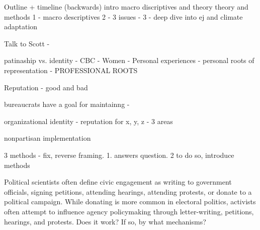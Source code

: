 Outline + timeline (backwards) 
intro
macro discriptives and theory 
theory and methods
1 - macro descriptives 
2 - 3 issues - 
3 - deep dive into ej and climate adaptation 

Talk to Scott 
- 

patinaship vs. identity 
- CBC
- Women 
- Personal experiences 
- personal roots of representation 
- PROFESSIONAL ROOTS 

Reputation - good and bad

bureaucrats have a goal for maintainng 
- 

organizational identity - reputation for x, y, z 
- 3 areas 

nonpartisan implementation


3 methods 
- fix, reverse framing. 1. answers question. 2 to do so, introduce methods 
















 


  
Political scientists often define civic engagement as writing to government officials, signing petitions, attending hearings, attending protests, or donate to a political campaign. While donating is more common in electoral politics, activists often attempt to influence agency policymaking through letter-writing, petitions, hearings, and protests. Does it work? If so, by what mechanisms?

